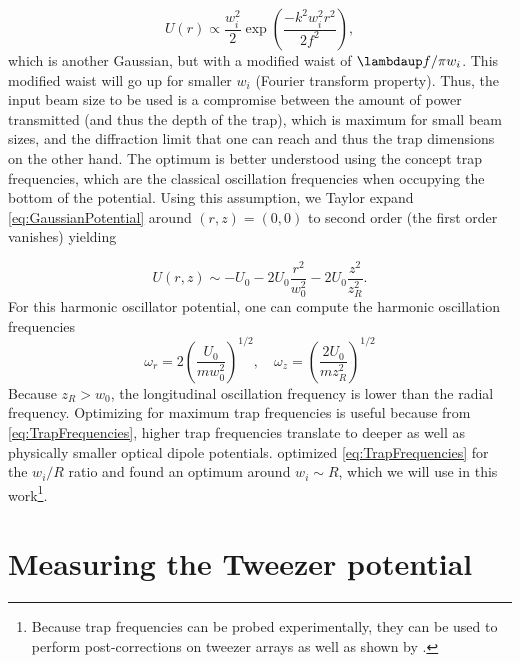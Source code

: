 \begin{equation}\label{eq:GaussianCase}
    U(r) \propto \frac{w_i^2}{2} \exp{\left(\frac{-k^2w_i^2 r^2}{2f^2}\right)},
\end{equation}
which is another Gaussian, but with a modified waist of $\lambdaup f / \pi w_i$.
This modified waist will go up for smaller $w_i$ (Fourier transform property). 
Thus, the input beam size to be used is a compromise between the amount of power transmitted (and thus the depth of the trap), which is maximum for small beam sizes, and the diffraction limit that one can reach and thus the trap dimensions on the other hand. 
The optimum is better understood using the concept trap frequencies, which are the classical oscillation frequencies when occupying the bottom of the potential. 
Using this assumption, we Taylor expand \cref{eq:GaussianPotential} around $(r,z)=(0,0)$ to second order (the first order vanishes) yielding \cite{Muldoon2012}

\begin{equation}\label{eq:ApproximateGaussianPotential}
    U(r,z) \sim -U_0 - 2U_0 \frac{r^2}{w_0^2} - 2U_0 \frac{z^2}{z_R^2}.
\end{equation}
For this harmonic oscillator potential, one can compute the harmonic oscillation frequencies 
\begin{equation}\label{eq:TrapFrequencies}
    \omega_r = 2\left(\frac{U_0}{m w_0^2}\right)^{1/2}, \quad
    \omega_z= \left(\frac{2 U_0}{m z_R^2}\right)^{1/2}
\end{equation}
Because $z_R > w_0$, the longitudinal oscillation frequency is lower than the radial frequency. 
Optimizing for maximum trap frequencies is useful because from \cref{eq:TrapFrequencies}, higher trap frequencies translate to deeper as well as physically smaller optical dipole potentials.
\cite{Madjarov2021} optimized \cref{eq:TrapFrequencies} for the $w_i/R$ ratio and found an optimum around $w_i\sim R$, which we will use in this work\footnote{Because trap frequencies can be probed experimentally, they can be used to perform post-corrections on tweezer arrays as well as shown by \cite{Ebadi2021}.}.

\section{Measuring the Tweezer potential}\label{sec:MeasuringTweezer}

